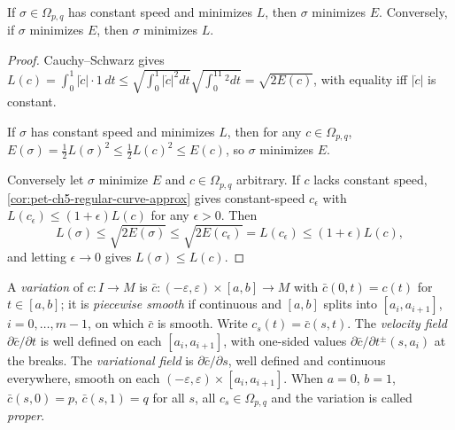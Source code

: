 \begin{proposition}
  \label{prop:pet-ch5-energy-length-minimizers}
  \leanok
  If $\sigma\in\Omega_{p,q}$ has constant speed and minimizes $L$, then $\sigma$
  minimizes $E$. Conversely, if $\sigma$ minimizes $E$, then $\sigma$ minimizes $L$.
\end{proposition}
\begin{proof}
  \leanok
  Cauchy--Schwarz gives $L(c)=\int_0^1|\dot c|\cdot1\,dt\le\sqrt{\int_0^1|\dot c|^2dt}
  \sqrt{\int_0^11^2dt}=\sqrt{2E(c)}$, with equality iff $|\dot c|$ is constant.

  If $\sigma$ has constant speed and minimizes $L$, then for any $c\in\Omega_{p,q}$,
  $E(\sigma)=\tfrac12L(\sigma)^2\le\tfrac12L(c)^2\le E(c)$, so $\sigma$ minimizes $E$.

  Conversely let $\sigma$ minimize $E$ and $c\in\Omega_{p,q}$ arbitrary. If $c$ lacks
  constant speed, \cref{cor:pet-ch5-regular-curve-approx} gives constant-speed
  $c_\epsilon$ with $L(c_\epsilon)\le(1+\epsilon)L(c)$ for any $\epsilon>0$. Then
  \[
    L(\sigma)\le\sqrt{2E(\sigma)}\le\sqrt{2E(c_\epsilon)}=L(c_\epsilon)\le(1+\epsilon)L(c),
  \]
  and letting $\epsilon\to0$ gives $L(\sigma)\le L(c)$.
\end{proof}

\begin{definition}
  \label{def:pet-ch5-variation}
  \leanok
  A \emph{variation} of $c:I\to M$ is $\bar c:(-\varepsilon,\varepsilon)\times[a,b]\to
  M$ with $\bar c(0,t)=c(t)$ for $t\in[a,b]$; it is \emph{piecewise smooth} if
  continuous and $[a,b]$ splits into $[a_i,a_{i+1}]$, $i=0,\dots,m-1$, on which
  $\bar c$ is smooth. Write $c_s(t)=\bar c(s,t)$. The \emph{velocity field}
  $\partial\bar c/\partial t$ is well defined on each $[a_i,a_{i+1}]$, with one-sided
  values $\partial\bar c/\partial t^\pm(s,a_i)$ at the breaks. The \emph{variational
  field} is $\partial\bar c/\partial s$, well defined and continuous everywhere,
  smooth on each $(-\varepsilon,\varepsilon)\times[a_i,a_{i+1}]$. When $a=0$, $b=1$,
  $\bar c(s,0)=p$, $\bar c(s,1)=q$ for all $s$, all $c_s\in\Omega_{p,q}$ and the
  variation is called \emph{proper}.
\end{definition}

